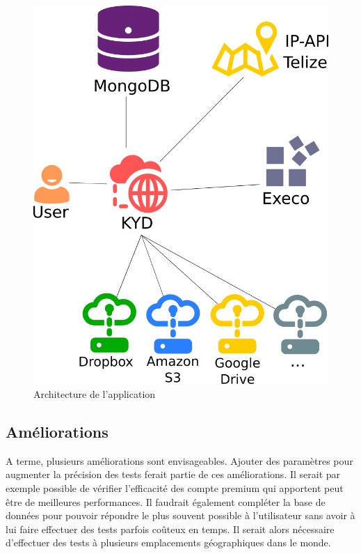 \documentclass[10pt]{article}
\begin{document}
\newpage

\begin{figure}[h] \centering \includegraphics[scale=0.5]{architecture.png}
\caption{Architecture de l'application} \label{fig:Architecture de
l'application} \end{figure}

\subsection{Améliorations}

A terme, plusieurs améliorations sont envisageables. Ajouter des paramètres pour
augmenter la précision des tests ferait partie de ces améliorations. Il serait
par exemple possible de vérifier l'efficacité des compte premium qui apportent
peut être de meilleures performances. Il faudrait également compléter la base de
données pour pouvoir répondre le plus souvent possible à l'utilisateur sans
avoir à lui faire effectuer des tests parfois coûteux en temps. Il serait alors
nécessaire d'effectuer des tests à plusieurs emplacements géographiques dans le
monde.\\
\end{document}
